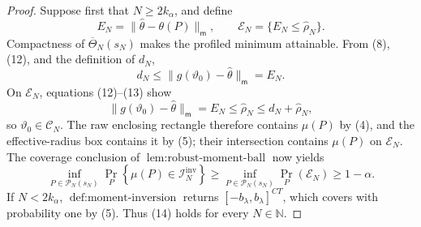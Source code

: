 \documentclass{article}
\begin{document}
\begin{proof}
Suppose first that \(N\geq2k_\alpha\), and define
\[
 E_N=\|\widehat\theta-\theta(P)\|_{\mathsf m},
 \qquad
 \mathcal E_N=\{E_N\leq\widehat\rho_N\}.
\]
Compactness of \(\overline\Theta_N(s_N)\) makes the profiled minimum attainable.  From (8), (12), and the definition of \(d_N\),
\[
 d_N\leq\|g(\vartheta_0)-\widehat\theta\|_{\mathsf m}=E_N.
 \tag{13}
\]
On \(\mathcal E_N\), equations (12)--(13) show
\[
 \|g(\vartheta_0)-\widehat\theta\|_{\mathsf m}
 =E_N\leq\widehat\rho_N\leq d_N+\widehat\rho_N,
\]
so \(\vartheta_0\in\mathcal C_N\).  The raw enclosing rectangle therefore contains \(\mu(P)\) by (4), and the effective-radius box contains it by (5); their intersection contains \(\mu(P)\) on \(\mathcal E_N\).  The coverage conclusion of \(\operatorname{lem:robust\text{-}moment\text{-}ball}\) now yields
\[
 \inf_{P\in\mathcal P_N(s_N)}
 \Pr_P\!\left\{\mu(P)\in\mathcal I_N^{\mathrm{inv}}\right\}
 \geq
 \inf_{P\in\mathcal P_N(s_N)}\Pr_P(\mathcal E_N)
 \geq1-\alpha.
 \tag{14}
\]
If \(N<2k_\alpha\), \(\operatorname{def:moment\text{-}inversion}\) returns \([-b_\lambda,b_\lambda]^{CT}\), which covers with probability one by (5).  Thus (14) holds for every \(N\in\mathbb N\).


\end{proof}
\end{document}
